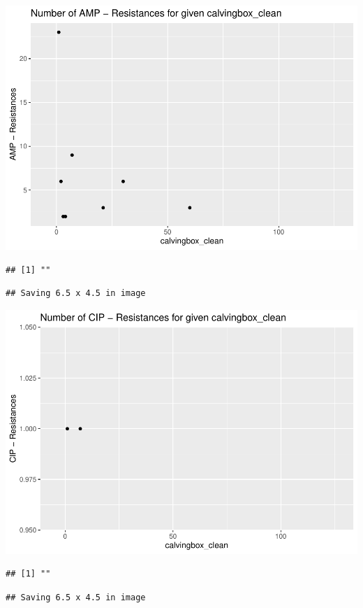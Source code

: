 \documentclass[
]{article}
\begin{document}
\includegraphics{NResistenzen_files/figure-latex/numerical_variables-21.pdf}

\begin{verbatim}
## [1] ""
\end{verbatim}

\begin{verbatim}
## Saving 6.5 x 4.5 in image
\end{verbatim}

\includegraphics{NResistenzen_files/figure-latex/numerical_variables-22.pdf}

\begin{verbatim}
## [1] ""
\end{verbatim}

\begin{verbatim}
## Saving 6.5 x 4.5 in image
\end{verbatim}
\end{document}
